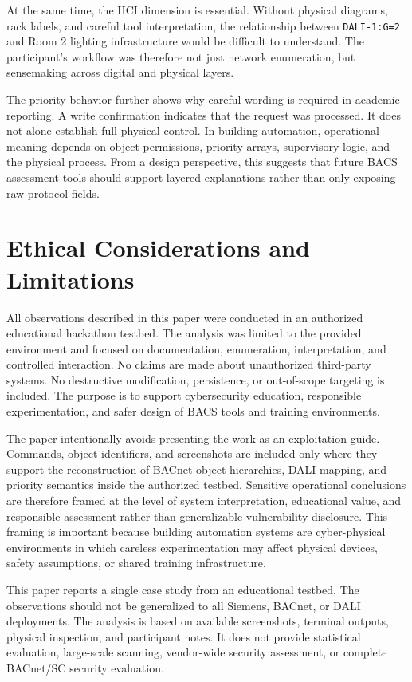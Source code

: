 \documentclass[10pt,conference]{IEEEtran}
\begin{document}
At the same time, the HCI dimension is essential. Without physical diagrams, rack labels, and careful tool interpretation, the relationship between \texttt{DALI-1:G=2} and Room 2 lighting infrastructure would be difficult to understand. The participant's workflow was therefore not just network enumeration, but sensemaking across digital and physical layers.

The priority behavior further shows why careful wording is required in academic reporting. A write confirmation indicates that the request was processed. It does not alone establish full physical control. In building automation, operational meaning depends on object permissions, priority arrays, supervisory logic, and the physical process. From a design perspective, this suggests that future BACS assessment tools should support layered explanations rather than only exposing raw protocol fields.

\section{Ethical Considerations and Limitations}

All observations described in this paper were conducted in an authorized educational hackathon testbed. The analysis was limited to the provided environment and focused on documentation, enumeration, interpretation, and controlled interaction. No claims are made about unauthorized third-party systems. No destructive modification, persistence, or out-of-scope targeting is included. The purpose is to support cybersecurity education, responsible experimentation, and safer design of BACS tools and training environments.

The paper intentionally avoids presenting the work as an exploitation guide. Commands, object identifiers, and screenshots are included only where they support the reconstruction of BACnet object hierarchies, DALI mapping, and priority semantics inside the authorized testbed. Sensitive operational conclusions are therefore framed at the level of system interpretation, educational value, and responsible assessment rather than generalizable vulnerability disclosure. This framing is important because building automation systems are cyber-physical environments in which careless experimentation may affect physical devices, safety assumptions, or shared training infrastructure.

This paper reports a single case study from an educational testbed. The observations should not be generalized to all Siemens, BACnet, or DALI deployments. The analysis is based on available screenshots, terminal outputs, physical inspection, and participant notes. It does not provide statistical evaluation, large-scale scanning, vendor-wide security assessment, or complete BACnet/SC security evaluation.
\end{document}
